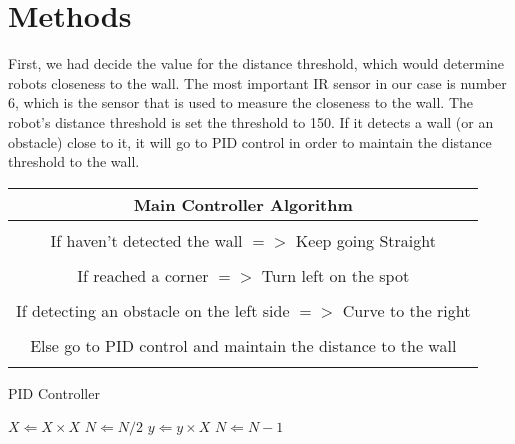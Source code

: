 \documentclass[]{article}
\begin{document}
\section{Methods}
First, we had decide the value for the distance threshold, which would determine robots closeness to the wall. The most important IR sensor in our case is number 6, which is the sensor that is used to measure the closeness to the wall. The robot’s distance threshold is set the threshold to 150. If it detects a wall (or an obstacle) close to it, it will go to PID control in order to maintain the distance threshold to the wall.\\

\begin{center}
\begin{tabular}{ |c| } 
 \hline
 \textbf{Main Controller Algorithm} \\
 \hline
 \\
 If haven't detected the wall $=>$ Keep going Straight \\ \\
 If reached a corner $=>$ Turn left on the spot \\ \\
 If detecting an obstacle on the left side $=>$ Curve to the right \\ \\
 Else go to PID control and maintain the distance to the wall \\ \\
 \hline
\end{tabular}
\end{center}

\begin{algorithm}                      %
\caption{PID Controller}          %
\label{alg1}                           %
\begin{algorithmic}                    %

        
            \STATE $X \Leftarrow X \times X$
            \STATE $N \Leftarrow N / 2$
        \ELSE[$N$ is odd]
            \STATE $y \Leftarrow y \times X$
            \STATE $N \Leftarrow N - 1$
        \ENDIF
    \ENDWHILE
\end{algorithmic}
\end{algorithm}
\end{document}
